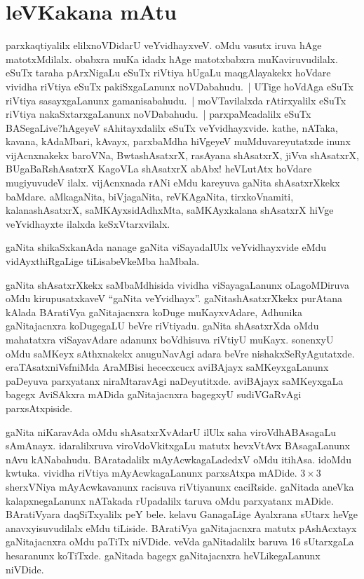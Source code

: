 \chapter*{leVKakana mAtu}


parxkaqtiyalilx elilxnoVDidarU veYvidhayxveV. oMdu vasutx iruva hAge matotxMdilalx. obabxra\- muKa idadx hAge matotxbabxra muKaviruvudilalx. eSuTx taraha pArxNigaLu eSuTx\- riVtiya hUgaLu maqgAlayakekx hoVdare vividha riVtiya eSuTx pakiSxgaLanunx noVDabahudu.~| UTige hoVdAga eSuTx riVtiya sasayxgaLanunx gamanisabahudu.~| moVTavilalxda rAtirx\-yalilx eSuTx riVtiya nakaSxtarxgaLanunx noVDabahudu.~| parxpaMcadalilx eSuTx BASegaLive?\break hAgeyeV sAhitayxdalilx eSuTx veYvidhayxvide. kathe, nATaka, kavana, kAdaMbari, kAvayx, parxbaMdha hiVgeyeV muMduvareyutatxde inunx vijAcnxnakekx baroVNa, BwtashAsatxrX, rasAyana shAsatxrX, jiVva shAsatxrX, BUgaBaRshAsatxrX KagoVLa shAsatxrX abAbx! heVLutAtx hoVdare mugiyuvudeV ilalx. \-vijAcnxnada rANi eMdu kareyuva gaNita shAsatxrXkekx baMdare. aMkagaNita, biVjagaNita,\- reVKAgaNita, tirxkoVnamiti, kalanashAsatxrX, saMKAyxsidAdhxMta, saMKAyxkalana shAsatxrX hiVge \-veYvidhayxte ilalxda keSxVtarxvilalx.

gaNita shikaSxkanAda nanage gaNita viSayadalUlx veYvidhayxvide eMdu vidAyxthiRgaLige tiLisabeVkeMba haMbala.

gaNita shAsatxrXkekx saMbaMdhisida vividha viSayagaLanunx oLagoMDiruva oMdu kirupusatxkaveV ``gaNita veYvidhayx''. gaNitashAsatxrXkekx purAtana kAlada BAratiVya gaNitajacnxra koDuge muKayxvAdare, Adhunika gaNitajacnxra koDugegaLU beVre riVtiyadu. gaNita shAsatxrXda oMdu mahatatxra viSayavAdare adanunx boVdhisuva riVtiyU muKayx. sonenxyU oMdu saMKeyx sAthxnakekx anuguNavAgi adara beVre nishakxSeRyAgutatxde. eraTAsatxniVsfniMda AraMBisi
hececxcucx aviBAjayx saMKeyxgaLanunx paDeyuva parxyatanx niraMtaravAgi naDeyu\-titxde. aviBAjayx saMKeyxgaLa bagegx AviSAkxra mADida gaNitajacnxra bagegxyU sudiVGaRvAgi parxsAtxpiside.

gaNita niKaravAda oMdu shAsatxrXvAdarU ilUlx saha viroVdhABAsagaLu sAmAnayx. idaralilxruva viroVdoVkitxgaLu matutx hevxVtAvx BAsagaLanunx nAvu kANabahudu. BArata\-dalilx mAyAcwkagaLadedxV oMdu itihAsa. idoMdu kwtuka. vividha riVtiya mAyA\-cwkagaLanunx parxsAtxpa mADide. $3\times 3$ sherxVNiya mAyAcwkavanunx racisuva riVtiyanunx caciRside. gaNitada aneVka kalapxnegaLanunx nATakada rUpadalilx taruva oMdu parxya\-tanx mADide. BAratiVyara daqSiTxyalilx peY bele. kelavu GanagaLige Ayalxrana sUtarx heVge anavxyisuvudilalx eMdu tiLiside. BAratiVya gaNitajacnxra matutx pAshAcxtayx gaNitaja\-cnxra oMdu paTiTx niVDide. veVda gaNitadalilx baruva {\rm 16} sUtarxgaLa hesaranunx koTiTxde. gaNitada bagegx gaNitajacnxra heVLikegaLanunx niVDide.

